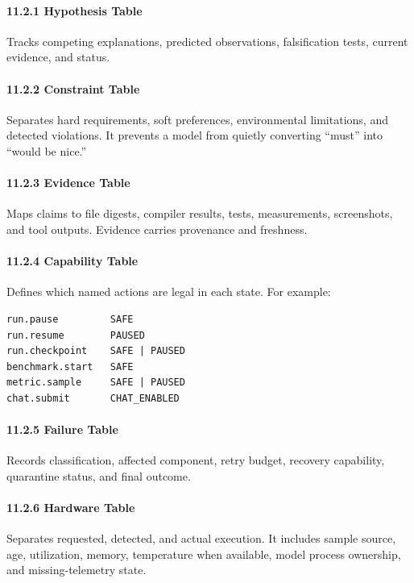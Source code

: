 \paragraph{11.2.1 Hypothesis Table}

Tracks competing explanations, predicted observations, falsification tests,
current evidence, and status.

\paragraph{11.2.2 Constraint Table}

Separates hard requirements, soft preferences, environmental limitations, and
detected violations. It prevents a model from quietly converting ``must'' into
``would be nice.''

\paragraph{11.2.3 Evidence Table}

Maps claims to file digests, compiler results, tests, measurements, screenshots,
and tool outputs. Evidence carries provenance and freshness.

\paragraph{11.2.4 Capability Table}

Defines which named actions are legal in each state. For example:

\begin{verbatim}
run.pause         SAFE
run.resume        PAUSED
run.checkpoint    SAFE | PAUSED
benchmark.start   SAFE
metric.sample     SAFE | PAUSED
chat.submit       CHAT_ENABLED
\end{verbatim}

\paragraph{11.2.5 Failure Table}

Records classification, affected component, retry budget, recovery capability,
quarantine status, and final outcome.

\paragraph{11.2.6 Hardware Table}

Separates requested, detected, and actual execution. It includes sample source,
age, utilization, memory, temperature when available, model process ownership,
and missing-telemetry state.

